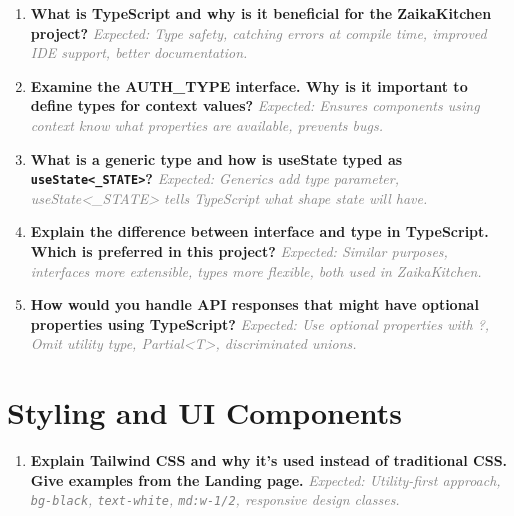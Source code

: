 \documentclass[12pt]{article}
\begin{document}
\begin{enumerate}[label=\textbf{\arabic*.}, itemsep=0.5cm, start=16]

\item \textbf{What is TypeScript and why is it beneficial for the ZaikaKitchen project?}
\newline
\textcolor{gray}{\textit{Expected: Type safety, catching errors at compile time, improved IDE support, better documentation.}}

\item \textbf{Examine the AUTH\_TYPE interface. Why is it important to define types for context values?}
\newline
\textcolor{gray}{\textit{Expected: Ensures components using context know what properties are available, prevents bugs.}}

\item \textbf{What is a generic type and how is useState typed as \texttt{useState<\_STATE>}?}
\newline
\textcolor{gray}{\textit{Expected: Generics add type parameter, useState<_STATE> tells TypeScript what shape state will have.}}

\item \textbf{Explain the difference between interface and type in TypeScript. Which is preferred in this project?}
\newline
\textcolor{gray}{\textit{Expected: Similar purposes, interfaces more extensible, types more flexible, both used in ZaikaKitchen.}}

\item \textbf{How would you handle API responses that might have optional properties using TypeScript?}
\newline
\textcolor{gray}{\textit{Expected: Use optional properties with ?, Omit utility type, Partial<T>, discriminated unions.}}

\end{enumerate}

\section*{Styling and UI Components}

\begin{enumerate}[label=\textbf{\arabic*.}, itemsep=0.5cm, start=21]

\item \textbf{Explain Tailwind CSS and why it's used instead of traditional CSS. Give examples from the Landing page.}
\newline
\textcolor{gray}{\textit{Expected: Utility-first approach, \texttt{bg-black}, \texttt{text-white}, \texttt{md:w-1/2}, responsive design classes.}}

\end{enumerate}
\end{document}
